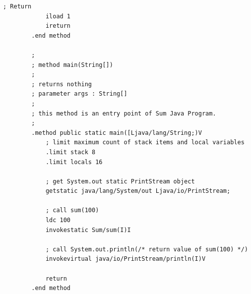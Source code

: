 \documentclass[a4paper, 12pt]{article}
\begin{document}
\begin{lstlisting}[gobble=8]
            ; Return 
            iload 1
            ireturn
        .end method
        
        ;
        ; method main(String[])
        ;
        ; returns nothing 
        ; parameter args : String[]
        ;
        ; this method is an entry point of Sum Java Program.
        ;
        .method public static main([Ljava/lang/String;)V
            ; limit maximum count of stack items and local variables
            .limit stack 8
            .limit locals 16
        
            ; get System.out static PrintStream object
            getstatic java/lang/System/out Ljava/io/PrintStream;
        
            ; call sum(100)
            ldc 100
            invokestatic Sum/sum(I)I
        
            ; call System.out.println(/* return value of sum(100) */)
            invokevirtual java/io/PrintStream/println(I)V
        
            return
        .end method
    \end{lstlisting}

    
    
\end{document}
